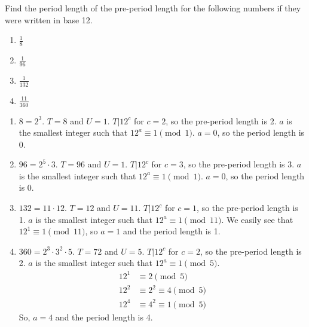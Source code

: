 \documentclass{article}
\begin{document}
\begin{problem}{}{}
    Find the period length of the pre-period length for the following numbers if they were written in base 12.
    \begin{enumerate}[label=\textbf{\arabic*}.]
        \item $\frac{1}{8}$
        \item $\frac{1}{96}$
        \item $\frac{1}{132}$
        \item $\frac{11}{360}$
    \end{enumerate}
\end{problem}
\begin{solution}{}{}
    \begin{enumerate}[label=\textbf{\arabic*}.]
        \item $8=2^3$. $T=8$ and $U=1$. $T|12^c$ for $c=2$, so the pre-period length is 2. $a$ is the smallest integer such that $12^a\equiv1\pmod{1}$. $a=0$, so the period length is 0.
        \item $96=2^5\cdot3$. $T=96$ and $U=1$. $T|12^c$ for $c=3$, so the pre-period length is 3. $a$ is the smallest integer such that $12^a\equiv1\pmod{1}$. $a=0$, so the period length is 0.
        \item $132=11\cdot12$. $T=12$ and $U=11$. $T|12^c$ for $c=1$, so the pre-period length is 1. $a$ is the smallest integer such that $12^a\equiv1\pmod{11}$. We easily see that $12^1\equiv1\pmod{11}$, so $a=1$ and the period length is 1.
        \item $360=2^3\cdot3^2\cdot5$. $T=72$ and $U=5$. $T|12^c$ for $c=2$, so the pre-period length is 2. $a$ is the smallest integer such that $12^a\equiv1\pmod{5}$.
        \begin{align*}
            12^1 &\equiv 2 \pmod{5} \\
            12^2 &\equiv2^2\equiv 4 \pmod{5} \\
            12^4&\equiv4^2\equiv1 \pmod{5}
        \end{align*}
        So, $a=4$ and the period length is 4.
    \end{enumerate}
\end{solution}
\end{document}
